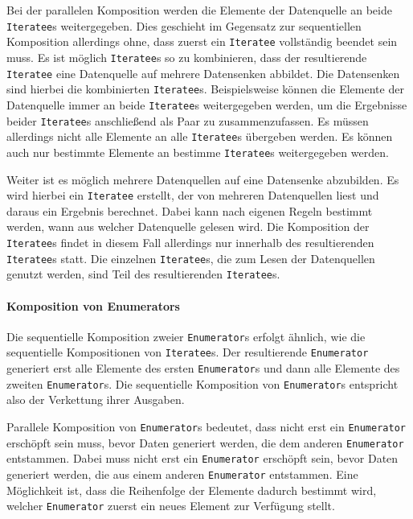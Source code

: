 \documentclass[draft=false
              ,paper=a4
              ,twoside=false
              ,fontsize=11pt
              ,headsepline
              ,BCOR10mm
              ,DIV11
              ]{scrbook}
\begin{document}
Bei der parallelen Komposition werden die Elemente der Datenquelle an beide \lstinline|Iteratee|s weitergegeben.
Dies geschieht im Gegensatz zur sequentiellen Komposition allerdings ohne, dass zuerst ein \lstinline|Iteratee| vollständig beendet sein muss.
Es ist möglich \lstinline|Iteratee|s so zu kombinieren, dass der resultierende \lstinline|Iteratee| eine Datenquelle auf mehrere Datensenken abbildet.
Die Datensenken sind hierbei die kombinierten \lstinline|Iteratee|s.
Beispielsweise können die Elemente der Datenquelle immer an beide \lstinline|Iteratee|s weitergegeben werden, um die Ergebnisse beider \lstinline|Iteratee|s anschließend als Paar zu zusammenzufassen.
Es müssen allerdings nicht alle Elemente an alle \lstinline|Iteratee|s übergeben werden.
Es können auch nur bestimmte Elemente an bestimme \lstinline|Iteratee|s weitergegeben werden. %

Weiter ist es möglich mehrere Datenquellen auf eine Datensenke abzubilden.
Es wird hierbei ein \lstinline|Iteratee| erstellt, der von mehreren Datenquellen liest und daraus ein Ergebnis berechnet.
Dabei kann nach eigenen Regeln bestimmt werden, wann aus welcher Datenquelle gelesen wird.
Die Komposition der \lstinline|Iteratee|s findet in diesem Fall allerdings nur innerhalb des resultierenden \lstinline|Iteratee|s statt.
Die einzelnen \lstinline|Iteratee|s, die zum Lesen der Datenquellen genutzt werden, sind Teil des resultierenden \lstinline|Iteratee|s.


\paragraph{Komposition von Enumerators} %
\label{par:komposition_von_enumerators}\mbox{} %

Die sequentielle Komposition zweier \lstinline|Enumerator|s erfolgt ähnlich, wie die sequentielle Kompositionen von \lstinline|Iteratee|s.
Der resultierende \lstinline|Enumerator| generiert erst alle Elemente des ersten \lstinline|Enumerator|s und dann alle Elemente des zweiten \lstinline|Enumerator|s.
Die sequentielle Komposition von \lstinline|Enumerator|s entspricht also der Verkettung ihrer Ausgaben. %

Parallele Komposition von \lstinline|Enumerator|s bedeutet, dass nicht erst ein \lstinline|Enumerator| erschöpft sein muss, bevor Daten generiert werden, die dem anderen \lstinline|Enumerator| entstammen.
Dabei muss nicht erst ein \lstinline|Enumerator| erschöpft sein, bevor Daten generiert werden, die aus einem anderen \lstinline|Enumerator| entstammen.
Eine Möglichkeit ist, dass die Reihenfolge der Elemente dadurch bestimmt wird, welcher \lstinline|Enumerator| zuerst ein neues Element zur Verfügung stellt. %
\end{document}
